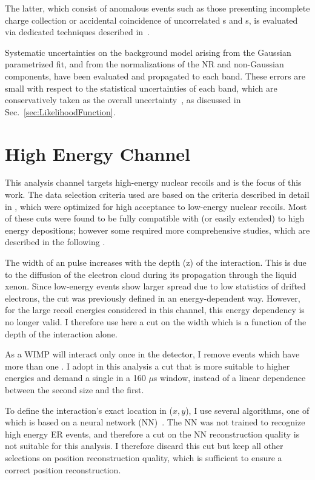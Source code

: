 The latter, which consist of anomalous events such as those 
presenting incomplete charge collection or accidental coincidence of uncorrelated \Si{}s and \Sii{}s,  
is evaluated via dedicated techniques described in~\cite{xe100_run_combination}.

Systematic uncertainties on the background model arising from the Gaussian parametrized fit, and from the normalizations of the NR and non-Gaussian components, have been evaluated and propagated to each band. 
These errors are small with respect to the statistical uncertainties of each band, which are conservatively taken as the overall uncertainty~\cite{xe100_run_combination}, as discussed in Sec.~\ref{sec:LikelihoodFunction}.



\section{High Energy Channel}
\label{subsubsec:HighE}
This analysis channel targets high-energy nuclear recoils and is the focus of this work. The data selection criteria used are based on the criteria described in detail in \cite{Aprile:2012vw}, which were optimized for high acceptance to low-energy nuclear recoils. Most of these cuts were found to be fully compatible with (or easily extended) to high energy depositions; however some required more comprehensive studies, which are described in the following . 

The width of an \Sii{} pulse increases with the depth (z) of the interaction. This is due to the diffusion of the electron cloud during its propagation
through the liquid xenon. Since low-energy \Sii{} events show larger spread
due to low statistics of drifted electrons, the cut was previously defined in an energy-dependent way. However, for the large recoil energies considered in this channel, this energy dependency is no longer valid. I therefore use here a cut on the \Sii{} width which is a function of the depth of the interaction alone. 

As a WIMP will interact only once in the detector, I remove events which have more than one \Sii{}. I adopt in this analysis a cut that is more suitable to higher energies and demand a single \Sii{} in a 160 $\mu$s window, instead of a linear dependence between the second \Sii{} size and the first. 

To define the interaction's exact location in ($x,y$), I use several algorithms, one of which is based on a neural network (NN)~\cite{Aprile:2012vw}. The NN was not trained to recognize high energy ER events, and therefore a cut on the NN reconstruction quality is not suitable for this analysis. I therefore discard this cut but keep all other selections on position reconstruction quality, which is sufficient to ensure a correct position reconstruction. 

